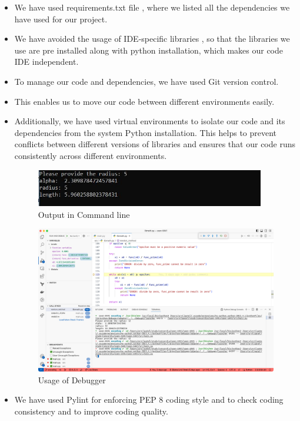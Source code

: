 \noindent 
\begin{itemize}
    \item We have used requirements.txt file , where we listed all the dependencies we have used for our project.
    \item We have avoided the usage of IDE-specific libraries , so that the libraries we use are pre installed along with python installation, which makes our code IDE independent.
    \item To manage our code and dependencies, we have used Git version control.
    \item This enables us to move our code between different environments easily.
    \item Additionally, we have used virtual environments to isolate our code and its dependencies from the system Python installation. This helps to prevent conflicts between different versions of libraries and ensures that our code runs consistently across different environments. 
 
    \begin{figure}[h]
    \centering
    \includegraphics[width=10cm]{images/CMD.png}
    \caption{Output in Command line}
    \label{fig:CMD}
    \end{figure}
    
    \begin{figure}[h]
    \centering
    \includegraphics[width=12cm]{images/debugger.png}
    \caption{Usage of Debugger}
    \label{fig:debugger}
    \end{figure}
    \item We have used Pylint for enforcing PEP 8 coding style and to check coding consistency and to improve coding quality.


\end{itemize}
